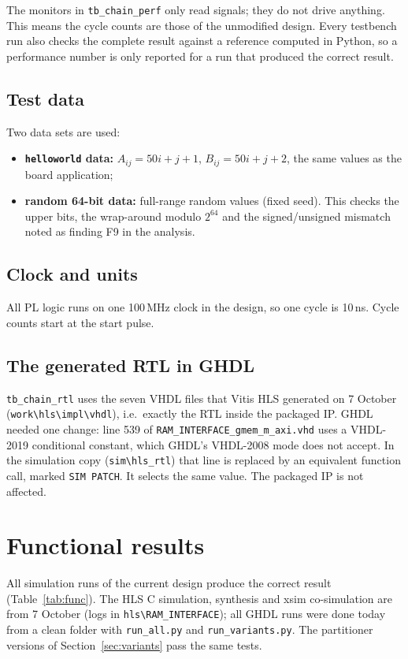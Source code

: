 \documentclass[11pt,a4paper]{article}
\newcommand{\code}[1]{\texttt{#1}}
\begin{document}
The monitors in \code{tb\_chain\_perf} only read signals; they do not drive anything. This means the cycle counts are those of the unmodified design. Every testbench run also checks the complete result against a reference computed in Python, so a performance number is only reported for a run that produced the correct result.

\subsection{Test data}
Two data sets are used:
\begin{itemize}[noitemsep]
  \item \textbf{\code{helloworld} data:} $A_{ij} = 50i + j + 1$, $B_{ij} = 50i + j + 2$, the same values as the board application;
  \item \textbf{random 64-bit data:} full-range random values (fixed seed). This checks the upper bits, the wrap-around modulo $2^{64}$ and the signed/unsigned mismatch noted as finding F9 in the analysis.
\end{itemize}

\subsection{Clock and units}
All PL logic runs on one 100\,MHz clock in the design, so one cycle is 10\,ns. Cycle counts start at the start pulse.

\subsection{The generated RTL in GHDL}
\code{tb\_chain\_rtl} uses the seven VHDL files that Vitis HLS generated on 7 October (\code{work\textbackslash hls\textbackslash impl\textbackslash vhdl}), i.e.\ exactly the RTL inside the packaged IP. GHDL needed one change: line 539 of \code{RAM\_INTERFACE\_gmem\_m\_axi.vhd} uses a VHDL-2019 conditional constant, which GHDL's VHDL-2008 mode does not accept. In the simulation copy (\code{sim\textbackslash hls\_rtl}) that line is replaced by an equivalent function call, marked \code{SIM PATCH}. It selects the same value. The packaged IP is not affected.

\section{Functional results}
All simulation runs of the current design produce the correct result (Table~\ref{tab:func}). The HLS C simulation, synthesis and xsim co-simulation are from 7 October (logs in \code{hls\textbackslash RAM\_INTERFACE}); all GHDL runs were done today from a clean folder with \code{run\_all.py} and \code{run\_variants.py}. The partitioner versions of Section~\ref{sec:variants} pass the same tests.
\end{document}
